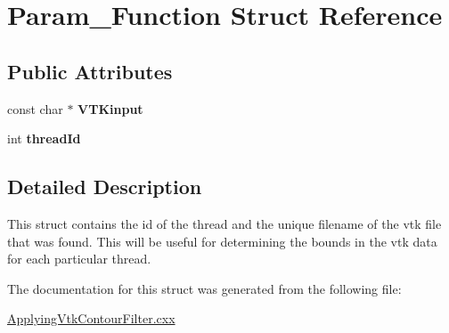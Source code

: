\hypertarget{structParam__Function}{\section{\-Param\-\_\-\-Function \-Struct \-Reference}
\label{structParam__Function}
}
\subsection*{\-Public \-Attributes}
\begin{DoxyCompactItemize}
\item 
\hypertarget{structParam__Function_aa784ecef91feb2bd20d83d9278198f70}{const char $\ast$ {\bfseries \-V\-T\-Kinput}}\label{structParam__Function_aa784ecef91feb2bd20d83d9278198f70}

\item 
\hypertarget{structParam__Function_a22891fef7632bbca3be29572c6f4f44b}{int {\bfseries thread\-Id}}\label{structParam__Function_a22891fef7632bbca3be29572c6f4f44b}

\end{DoxyCompactItemize}


\subsection{\-Detailed \-Description}
\-This struct contains the id of the thread and the unique filename of the vtk file that was found. \-This will be useful for determining the bounds in the vtk data for each particular thread. 

\-The documentation for this struct was generated from the following file\-:\begin{DoxyCompactItemize}
\item 
\hyperlink{ApplyingVtkContourFilter_8cxx}{\-Applying\-Vtk\-Contour\-Filter.\-cxx}\end{DoxyCompactItemize}
